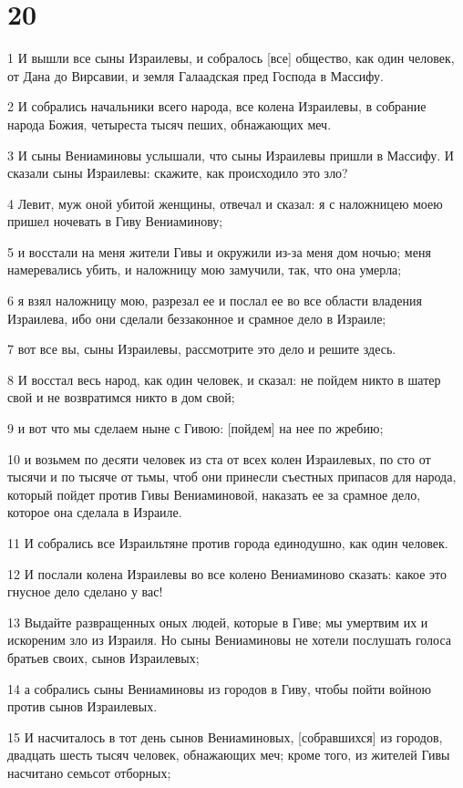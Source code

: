 \chapter{20}

\par 1 И вышли все сыны Израилевы, и собралось [все] общество, как один человек, от Дана до Вирсавии, и земля Галаадская пред Господа в Массифу.
\par 2 И собрались начальники всего народа, все колена Израилевы, в собрание народа Божия, четыреста тысяч пеших, обнажающих меч.
\par 3 И сыны Вениаминовы услышали, что сыны Израилевы пришли в Массифу. И сказали сыны Израилевы: скажите, как происходило это зло?
\par 4 Левит, муж оной убитой женщины, отвечал и сказал: я с наложницею моею пришел ночевать в Гиву Вениаминову;
\par 5 и восстали на меня жители Гивы и окружили из-за меня дом ночью; меня намеревались убить, и наложницу мою замучили, так, что она умерла;
\par 6 я взял наложницу мою, разрезал ее и послал ее во все области владения Израилева, ибо они сделали беззаконное и срамное дело в Израиле;
\par 7 вот все вы, сыны Израилевы, рассмотрите это дело и решите здесь.
\par 8 И восстал весь народ, как один человек, и сказал: не пойдем никто в шатер свой и не возвратимся никто в дом свой;
\par 9 и вот что мы сделаем ныне с Гивою: [пойдем] на нее по жребию;
\par 10 и возьмем по десяти человек из ста от всех колен Израилевых, по сто от тысячи и по тысяче от тьмы, чтоб они принесли съестных припасов для народа, который пойдет против Гивы Вениаминовой, наказать ее за срамное дело, которое она сделала в Израиле.
\par 11 И собрались все Израильтяне против города единодушно, как один человек.
\par 12 И послали колена Израилевы во все колено Вениаминово сказать: какое это гнусное дело сделано у вас!
\par 13 Выдайте развращенных оных людей, которые в Гиве; мы умертвим их и искореним зло из Израиля. Но сыны Вениаминовы не хотели послушать голоса братьев своих, сынов Израилевых;
\par 14 а собрались сыны Вениаминовы из городов в Гиву, чтобы пойти войною против сынов Израилевых.
\par 15 И насчиталось в тот день сынов Вениаминовых, [собравшихся] из городов, двадцать шесть тысяч человек, обнажающих меч; кроме того, из жителей Гивы насчитано семьсот отборных;
